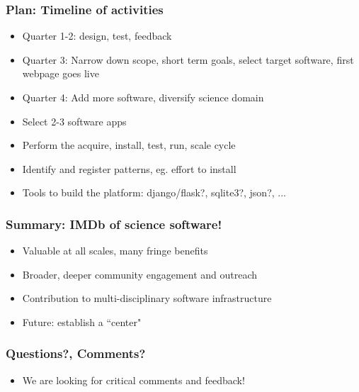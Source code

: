 \documentclass[hyperref={pdfpagelabels=false},12pt]{beamer}
\begin{document}
\begin{frame}
\frametitle{Plan: Timeline of activities }
\begin{itemize}
\itemsep1em
\item 
Quarter 1-2: design, test, feedback
\item
Quarter 3: Narrow down scope, short term goals, select target software, first webpage goes live
\item
Quarter 4: Add more software, diversify science domain
\item
Select 2-3 software apps
\item
Perform the acquire, install, test, run, scale cycle
\item
Identify and register patterns, eg. effort to install
\item
Tools to build the platform: django/flask?, sqlite3?, json?, ...
\end{itemize}
\end{frame}

\begin{frame}
\frametitle{Summary: IMDb of science software!}
\begin{itemize}
\itemsep1em
\item Valuable at all scales, many fringe benefits
\item Broader, deeper community engagement and outreach
\item Contribution to multi-disciplinary software infrastructure
\item Future: establish a ``center"
\end{itemize}
\end{frame}

\begin{frame}
\frametitle{Questions?, Comments?}
\begin{itemize}
\item We are looking for critical comments and feedback!
\end{itemize}
\end{frame}
\end{document}
